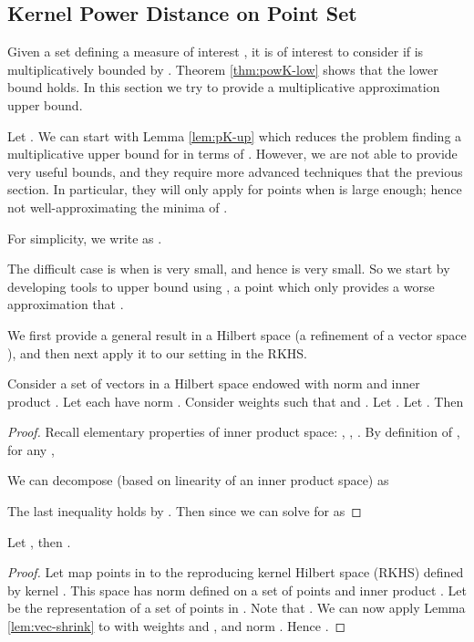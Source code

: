 \documentclass[11pt]{myclass}
\begin{document}
\subsection{Kernel Power Distance on Point Set }
\label{app:pow-justP}
Given a set  defining a measure of interest , it is of interest to consider if  is multiplicatively bounded by .  Theorem \ref{thm:powK-low} shows that the lower bound holds.  In this section we try to provide a multiplicative approximation upper bound.  

Let .
We can start with Lemma \ref{lem:pK-up} which reduces the problem finding a multiplicative upper bound for  in terms of .  
However, we are not able to provide very useful bounds, and they require more advanced techniques that the previous section.  In particular, they will only apply for points  when  is large enough; hence not well-approximating the minima of .  

For simplicity, we write  as . 

The difficult case is when  is very small, and hence  is very small.  So we start by developing tools to upper bound  using , a point which only provides a worse approximation that .  

We first provide a general result in a Hilbert space (a refinement of a vector space \cite{Daume2004}), and then next apply it to our setting in the RKHS.  




\begin{lemma}
\label{lem:vec-shrink}
Consider a set  of vectors in a Hilbert space endowed with norm  and inner product .  Let each  have norm .  
Consider weights  such that  and .  Let .  Let .
Then
 
\end{lemma}
\begin{proof}
Recall elementary properties of inner product space: 
, 
, 
. 
By definition of , 
for any , 

We can decompose  (based on linearity of an inner product space) as 

The last inequality holds by .  
Then since  we can solve for  as 

\end{proof}


\begin{lemma}
\label{lem:HK-shrink}
Let , then
.
\end{lemma}
\begin{proof}
Let  map points in  to the reproducing kernel Hilbert space (RKHS)  defined by kernel .  This space has norm  defined on a set of points  and inner product .  Let  be the representation of a set of points  in .  
Note that .  
We can now apply Lemma \ref{lem:vec-shrink} to  with weights  and , and norm .  Hence
.
\end{proof}
\end{document}
